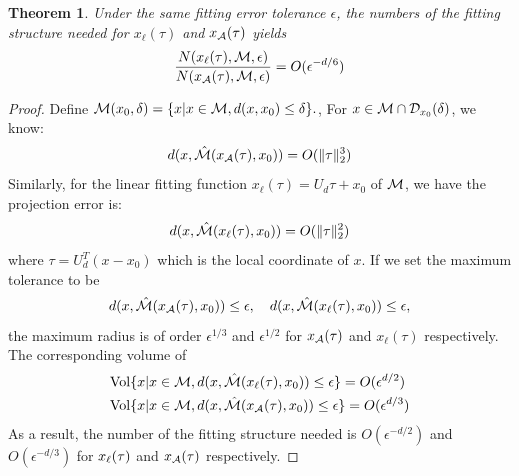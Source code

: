 \documentclass[aos,preprint]{imsart}
\newtheorem{theorem}{Theorem}[section]
\theoremstyle{remark}
\begin{document}
\begin{theorem}
Under the same fitting error tolerance $\epsilon$, the numbers of the fitting structure needed for $x_{\ell}(\tau)$ and $x_{\cal A}(\tau)$ yields
\[
\frac{N(x_{\ell}(\tau), {\cal M}, \epsilon )}{N(x_{\cal A}(\tau), {\cal M}, \epsilon )}=O(\epsilon^{-d/6})
\]
\end{theorem}
\begin{proof}
Define 
$
{\cal M}(x_0,\delta) = \{x| x \in {\cal M},d(x, x_0) \leq \delta\}.
$, For $x\in {\cal M}\cap {\cal D}_{x_0}(\delta)$, we know:
\[
d(x, {\cal \hat{M}}(x_{\cal A}(\tau),x_0)) = O(\|\tau\|_2^3)
\]
Similarly, for the linear fitting function $x_\ell(\tau) = U_d\tau+x_0$ of $\cal M$, we have the projection error is:
\[
d(x, {\cal \hat{M}}(x_\ell(\tau),x_0)) = O(\|\tau\|_2^2)
\]
where $\tau=U_d^T(x-x_0)$ which is the local coordinate of $x$. If we set the maximum tolerance to be 
\[
d(x, {\cal \hat{M}}(x_{\cal A}(\tau),x_0))\leq \epsilon,\quad d(x, {\cal \hat{M}}(x_\ell(\tau),x_0)) \leq \epsilon,
\]
the maximum radius is of order $\epsilon^{1/3}$ and $\epsilon^{1/2}$ for $x_{\cal A}(\tau)$ and $x_{\ell }(\tau)$  respectively.
The corresponding volume of 
\[
\begin{aligned}
&{\rm Vol} \{x| x\in {\cal M},d(x, \hat{\cal M}(x_{\cal \ell}(\tau),x_0))\leq \epsilon \} =O( \epsilon^{d/2})\\
&{\rm Vol} \{x| x\in{\cal M}, d(x, {\cal \hat{M}}(x_{\cal A}(\tau),x_0))\leq \epsilon \} =O(\epsilon^{d/3})
\end{aligned}
\]
As a result, the number of the fitting structure needed is $O( \epsilon^{-d/2})$ and $O(\epsilon^{-d/3})$ for $x_{\cal \ell}(\tau)$ and $x_{\cal A}(\tau)$ respectively. 
\end{proof}
\end{document}
